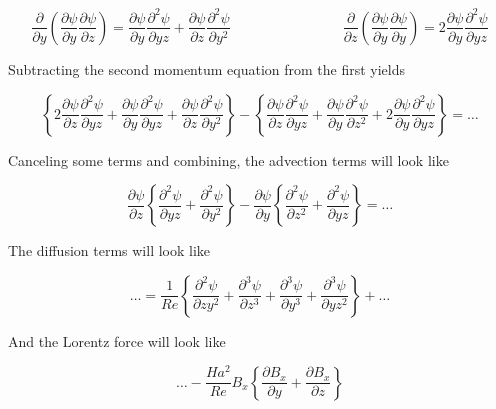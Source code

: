 \documentclass[11pt]{article}
\begin{document}
\begin{equation}
	\frac{\partial}{\partial y}
	\left(
	\frac{\partial \psi}{\partial y}
	\frac{\partial \psi}{\partial z}
	\right)
	=
	\frac{\partial \psi}{\partial y}
	\frac{\partial^2 \psi}{\partial yz} +
	\frac{\partial \psi}{\partial z}
	\frac{\partial^2 \psi}{\partial y^2}
	\qquad \qquad
	\qquad \qquad
	\frac{\partial}{\partial z}
	\left(
	\frac{\partial \psi}{\partial y}
	\frac{\partial \psi}{\partial y}
	\right)
	=
	2
	\frac{\partial \psi }{\partial y}
	\frac{\partial^2 \psi}{\partial yz}
\end{equation}

Subtracting the second momentum equation from the first yields

\begin{equation}
	\left\{
	2
	\frac{\partial \psi }{\partial z}
	\frac{\partial^2 \psi}{\partial yz}
	+
	\frac{\partial \psi}{\partial y}
	\frac{\partial^2 \psi}{\partial yz} +
	\frac{\partial \psi}{\partial z}
	\frac{\partial^2 \psi}{\partial y^2}
	\right\}
	-
	\left\{
	\frac{\partial \psi}{\partial z}
	\frac{\partial^2 \psi}{\partial yz} +
	\frac{\partial \psi}{\partial y}
	\frac{\partial^2 \psi}{\partial z^2}
	+
	2
	\frac{\partial \psi }{\partial y}
	\frac{\partial^2 \psi}{\partial yz}
	\right\}
	=
	\dots
\end{equation}

Canceling some terms and combining, the advection terms will look like


\begin{equation}
	\frac{\partial \psi }{\partial z}
	\left\{
	\frac{\partial^2 \psi}{\partial yz}
	+
	\frac{\partial^2 \psi}{\partial y^2}
	\right\}
	-
	\frac{\partial \psi}{\partial y}
	\left\{
	\frac{\partial^2 \psi}{\partial z^2}
	+
	\frac{\partial^2 \psi}{\partial yz}
	\right\}
	=
	\dots
\end{equation}


The diffusion terms will look like

\begin{equation}
	\dots
	=
	\frac{1}{Re}
	\left\{
	\frac{\partial^2 \psi}{\partial z y^2}
	+
	\frac{\partial^3 \psi}{\partial z^3}
	+
	\frac{\partial^3 \psi}{\partial y^3}
	+\frac{\partial^3 \psi}{\partial y z^2}
	\right\}
	+ \dots
\end{equation}

And the Lorentz force will look like

\begin{equation}
	\dots
	- 
	\frac{Ha^2}{Re}
	B_x
	\left\{
	\frac{\partial B_x}{\partial y} 
	+
	\frac{\partial B_x}{\partial z}
	\right\}
\end{equation}
\end{document}
